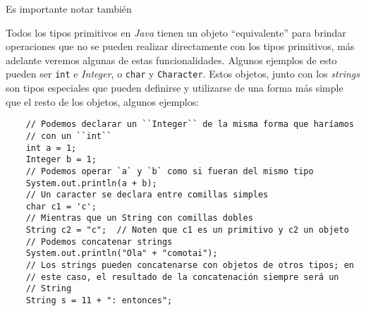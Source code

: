   Es importante notar también

  Todos los tipos primitivos en \textit{Java} tienen un objeto \enquote{equivalente} 
  para brindar operaciones que no se pueden realizar directamente con los tipos 
  primitivos, más adelante veremos algunas de estas funcionalidades.
  Algunos ejemplos de esto pueden ser \texttt{int} e \textit{Integer}, o 
  \texttt{char} y \texttt{Character}.
  Estos objetos, junto con los \textit{strings} son tipos especiales que pueden definirse y 
  utilizarse de una forma más simple que el resto de los objetos, algunos ejemplos:
  
  \begin{verbatim}
    // Podemos declarar un ``Integer`` de la misma forma que haríamos
    // con un ``int``
    int a = 1;
    Integer b = 1;
    // Podemos operar `a` y `b` como si fueran del mismo tipo
    System.out.println(a + b);
    // Un caracter se declara entre comillas simples
    char c1 = 'c';
    // Mientras que un String con comillas dobles
    String c2 = "c";  // Noten que c1 es un primitivo y c2 un objeto
    // Podemos concatenar strings
    System.out.println("Ola" + "comotai");
    // Los strings pueden concatenarse con objetos de otros tipos; en
    // este caso, el resultado de la concatenación siempre será un 
    // String
    String s = 11 + ": entonces";
  \end{verbatim}

